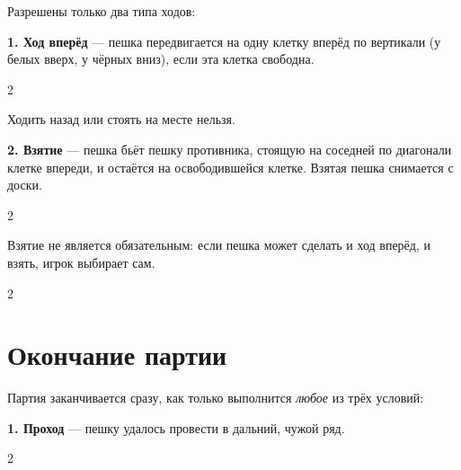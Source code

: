 \documentclass[12pt,a4paper]{article}
\begin{document}
Разрешены только два типа ходов:

\textbf{1. Ход вперёд} ---
пешка передвигается на одну клетку вперёд по вертикали (у белых вверх, у чёрных вниз), если эта клетка свободна.
\begin{center}
\begin{multicols}{2}
\columnbreak \par
{}
\end{multicols}
\end{center}
Ходить назад или стоять на месте нельзя.

\textbf{2. Взятие} ---
пешка бьёт пешку противника, стоящую на соседней по диагонали клетке впереди, и остаётся на освободившейся клетке.
Взятая пешка снимается с доски.
\begin{center}
\begin{multicols}{2}
\columnbreak \par
{} %
\end{multicols}
\end{center}

Взятие не является обязательным: если пешка может сделать и ход вперёд, и взять, игрок выбирает сам.
\begin{center}
\begin{multicols}{2}
\columnbreak \par
{} %
\end{multicols}
\end{center}


\newpage


\section*{Окончание партии}

Партия заканчивается сразу, как только выполнится \emph{любое} из трёх условий:

\textbf{1. Проход} --- пешку удалось провести в дальний, чужой ряд.
\begin{center}
\begin{multicols}{2}
\columnbreak \par
{} %
\end{multicols}
\end{center}
\end{document}
